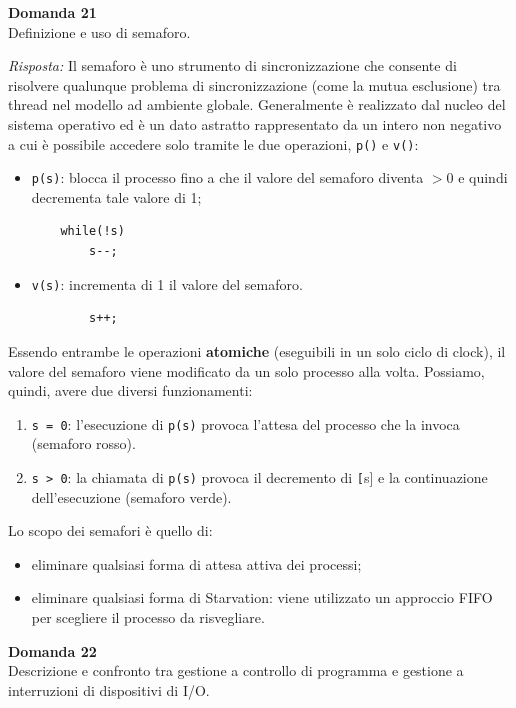 \documentclass{article}
\newenvironment{problem}[2][Domanda]
    { \begin{mdframed}[backgroundcolor=gray!20] \textbf{#1 #2} \\}
    {  \end{mdframed}}
\newenvironment{solution}
    {\textit{Risposta:}}
    {}
\begin{document}
\begin{problem}{21}
Definizione e uso di semaforo.
\end{problem}
\begin{solution}
Il semaforo è uno strumento di sincronizzazione che consente di risolvere qualunque problema di sincronizzazione (come la mutua esclusione) tra thread nel modello ad ambiente globale.
\newline
Generalmente è realizzato dal nucleo del sistema operativo ed è un dato astratto rappresentato da un intero non negativo a cui è possibile accedere solo tramite le due operazioni, \texttt{p()} e \texttt{v()}:
\begin{itemize}
    \item \texttt{p(s)}: blocca il processo fino a che il valore del semaforo diventa $> 0$ e quindi decrementa tale valore di 1;
\begin{verbatim}
    while(!s)
        s--;
    \end{verbatim}
    \item \texttt{v(s)}: incrementa di 1 il valore del semaforo.  
    \begin{verbatim}
        s++;
    \end{verbatim}
\end{itemize}
Essendo entrambe le operazioni \textbf{atomiche} (eseguibili in un solo ciclo di clock), il valore del semaforo viene modificato da un solo processo alla volta.
Possiamo, quindi, avere due diversi funzionamenti:  
\begin{enumerate}
    \item \texttt{s = 0}: l’esecuzione di \texttt{p(s)} provoca l’attesa del processo che la invoca (semaforo rosso).
    \item \texttt{s > 0}: la chiamata di \texttt{p(s)} provoca il decremento di \texttt[s] e la continuazione dell’esecuzione (semaforo verde).
\end{enumerate}
Lo scopo dei semafori è quello di:
\begin{itemize}
    \item eliminare qualsiasi forma di attesa attiva dei processi;
    \item eliminare qualsiasi forma di Starvation: viene utilizzato un approccio FIFO per scegliere il processo da risvegliare.
\end{itemize}
\end{solution}
\begin{problem}{22}
Descrizione e confronto tra gestione a controllo di programma e gestione a interruzioni di dispositivi di I/O.
\end{problem}
\end{document}
